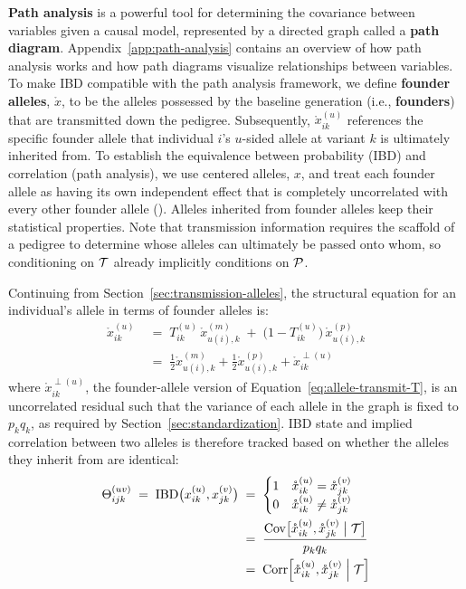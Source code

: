 \documentclass[12pt]{article}
\numberwithin{equation}{section}
\begin{document}
\textbf{Path analysis} is a powerful tool for determining the covariance between variables given a causal model, represented by a directed graph called a \textbf{path diagram}.
Appendix~\ref{app:path-analysis} contains an overview of how path analysis works and how path diagrams visualize relationships between variables.
To make IBD compatible with the path analysis framework, we define \textbf{founder alleles}, $\mathring{x}$, to be the alleles possessed by the baseline generation (i.e., \textbf{founders}) that are transmitted down the pedigree.
Subsequently, $\mathring{x}_{ik}^{(u)}$ references the specific founder allele that individual $i$'s $u$-sided allele at variant $k$ is ultimately inherited from.
To establish the equivalence between probability (IBD) and correlation (path analysis), we use centered alleles, $x$, and treat each founder allele as having its own independent effect that is completely uncorrelated with every other founder allele ().
Alleles inherited from founder alleles keep their statistical properties.
Note that transmission information requires the scaffold of a pedigree to determine whose alleles can ultimately be passed onto whom, so conditioning on $\mathcal{T}$ already implicitly conditions on $\mathcal{P}$.

Continuing from Section~\ref{sec:transmission-alleles}, the structural equation for an individual's allele in terms of founder alleles is:
\begin{equation}\label{eq:founder-transmit}
\begin{aligned}
    \mathring{x}^{(u)}_{ik}
    \;&=\; T^{(u)}_{ik}\, \mathring{x}^{(m)}_{u(i),k} \;+\; \big(1 - T^{(u)}_{ik}\big)\, \mathring{x}^{(p)}_{u(i),k} \\
    \;&=\; \tfrac12 \mathring{x}^{(m)}_{u(i),k} + \tfrac12 \mathring{x}^{(p)}_{u(i),k} + \mathring{x}^{\perp(u)}_{ik}
\end{aligned}
\end{equation}
where $\mathring{x}^{\perp(u)}_{ik}$, the founder-allele version of Equation~\eqref{eq:allele-transmit-T}, is an uncorrelated residual such that the variance of each allele in the graph is fixed to $p_k q_k$, as required by Section~\ref{sec:standardization}.
IBD state and implied correlation between two alleles is therefore tracked based on whether the alleles they inherit from are identical:
\begin{equation}\label{eq:ibd-founder}
\begin{aligned}
    \Theta^{(uv)}_{ijk} \;=\;
    \mathrm{IBD}\big(x_{ik}^{(u)}, x_{jk}^{(v)}\big)
    \;&=\; \begin{cases}
        1 & \mathring{x}_{ik}^{(u)} = \mathring{x}_{jk}^{(v)} \\
        0 & \mathring{x}_{ik}^{(u)} \neq \mathring{x}_{jk}^{(v)}
    \end{cases} \\
    \;&=\; \frac{\mathrm{Cov}\big[\mathring{x}_{ik}^{(u)}, \mathring{x}_{jk}^{(v)} \;\big|\; \mathcal{T}\big]}{p_k q_k} \\
    \;&=\; \mathrm{Corr}\Big[\mathring{x}_{ik}^{(u)}, \mathring{x}_{jk}^{(v)} \;\Big|\; \mathcal{T} \Big]
\end{aligned}
\end{equation}
\end{document}
